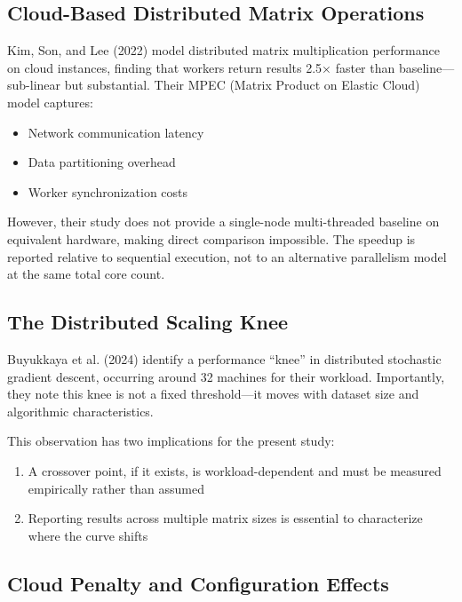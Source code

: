 \subsection{Cloud-Based Distributed Matrix Operations}

Kim, Son, and Lee (2022) \cite{kim2022mpec} model distributed matrix multiplication performance on cloud instances, finding that workers return results 2.5× faster than baseline—sub-linear but substantial. Their MPEC (Matrix Product on Elastic Cloud) model captures:

\begin{itemize}
    \item Network communication latency
    \item Data partitioning overhead
    \item Worker synchronization costs
\end{itemize}

However, their study does not provide a single-node multi-threaded baseline on equivalent hardware, making direct comparison impossible. The speedup is reported relative to sequential execution, not to an alternative parallelism model at the same total core count.

\subsection{The Distributed Scaling Knee}

Buyukkaya et al. (2024) \cite{buyukkaya2024stochastic} identify a performance ``knee'' in distributed stochastic gradient descent, occurring around 32 machines for their workload. Importantly, they note this knee is not a fixed threshold—it moves with dataset size and algorithmic characteristics.

This observation has two implications for the present study:
\begin{enumerate}
    \item A crossover point, if it exists, is workload-dependent and must be measured empirically rather than assumed
    \item Reporting results across multiple matrix sizes is essential to characterize where the curve shifts
\end{enumerate}

\subsection{Cloud Penalty and Configuration Effects}

